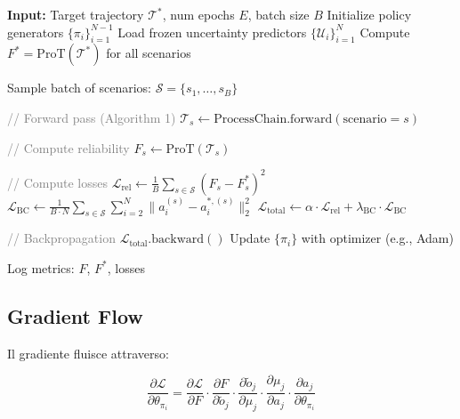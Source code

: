 \documentclass[11pt,a4paper]{article}
\begin{document}
\begin{algorithm}[H]
\caption{Controller Training Loop}
\begin{algorithmic}[1]
\State \textbf{Input:} Target trajectory $\mathcal{T}^*$, num epochs $E$, batch size $B$
\State Initialize policy generators $\{\pi_i\}_{i=1}^{N-1}$
\State Load frozen uncertainty predictors $\{\mathcal{U}_i\}_{i=1}^N$
\State Compute $F^* = \text{ProT}(\mathcal{T}^*)$ for all scenarios

    \State Sample batch of scenarios: $\mathcal{S} = \{s_1, \ldots, s_B\}$

        \State \textcolor{gray}{// Forward pass (Algorithm 1)}
        \State $\mathcal{T}_s \gets \text{ProcessChain.forward}(\text{scenario}=s)$

        \State \textcolor{gray}{// Compute reliability}
        \State $F_s \gets \text{ProT}(\mathcal{T}_s)$ 
    \EndFor

    \State \textcolor{gray}{// Compute losses}
    \State $\mathcal{L}_{\text{rel}} \gets \frac{1}{B} \sum_{s \in \mathcal{S}} (F_s - F_s^*)^2$
    \State $\mathcal{L}_{\text{BC}} \gets \frac{1}{B \cdot N} \sum_{s \in \mathcal{S}} \sum_{i=2}^N \|a_i^{(s)} - a_i^{*,(s)}\|_2^2$
    \State $\mathcal{L}_{\text{total}} \gets \alpha \cdot \mathcal{L}_{\text{rel}} + \lambda_{\text{BC}} \cdot \mathcal{L}_{\text{BC}}$

    \State \textcolor{gray}{// Backpropagation}
    \State $\mathcal{L}_{\text{total}}.\text{backward}()$
    \State Update $\{\pi_i\}$ with optimizer (e.g., Adam)

        \State Log metrics: $F$, $F^*$, losses
    \EndIf
\EndFor
\end{algorithmic}
\end{algorithm}

\subsection{Gradient Flow}

Il gradiente fluisce attraverso:

\begin{equation}
\frac{\partial \mathcal{L}}{\partial \theta_{\pi_i}} = \frac{\partial \mathcal{L}}{\partial F} \cdot \frac{\partial F}{\partial \tilde{o}_j} \cdot \frac{\partial \tilde{o}_j}{\partial \mu_j} \cdot \frac{\partial \mu_j}{\partial a_j} \cdot \frac{\partial a_j}{\partial \theta_{\pi_i}}
\end{equation}
\end{document}
